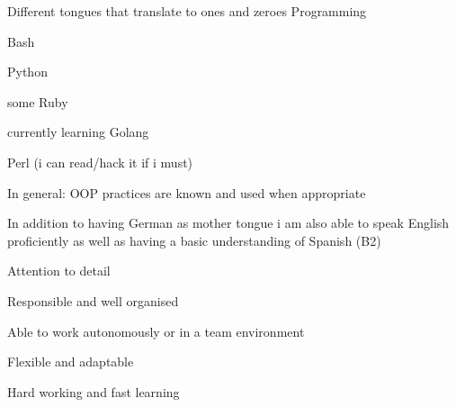 \begin{cventries}
  \cventry
    {Different tongues that translate to ones and zeroes}
    {Programming}
    {}
    {}
    {
      \begin{cvitems}
        \item Bash
        \item Python
        \item some Ruby
        \item currently learning Golang
        \item Perl (i can read/hack it if i must)
        \item In general: OOP practices are known and used when appropriate
      \end{cvitems}
    }

\end{cventries}


\begin{cvparagraph}
In addition to having German as mother tongue i am also able to speak English proficiently as well
  as having a basic understanding of Spanish (B2)
\end{cvparagraph}

\newline

\begin{cvparagraph}

\begin{cvitems}
  \item Attention to detail
  \item Responsible and well organised
  \item Able to work autonomously or in a team environment
  \item Flexible and adaptable
  \item Hard working and fast learning
\end{cvitems}
\end{cvparagraph}



